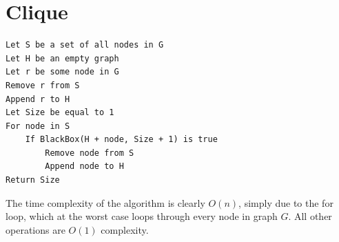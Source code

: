 \documentclass[12pt]{article}
\begin{document}
\section{Clique}\label{clique}
\begin{addmargin}[2em]{2em}
\begin{lstlisting}
Let S be a set of all nodes in G
Let H be an empty graph
Let r be some node in G
Remove r from S
Append r to H
Let Size be equal to 1
For node in S
    If BlackBox(H + node, Size + 1) is true
        Remove node from S
        Append node to H
Return Size
\end{lstlisting}
The time complexity of the algorithm is clearly $O(n)$, simply due to the for loop, which at the worst case loops through every node in graph $G$. All other operations are $O(1)$ complexity.
\end{addmargin}
\end{document}
